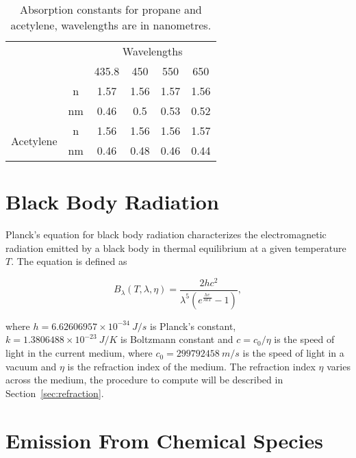 \begin{table}[htbp!]
\centering
\caption{Absorption constants for propane and acetylene, wavelengths are in nanometres.}
\label{tb:soot_absorption_coefficients}
\begin{tabular}{cc|c|c|c|c|}
\cline{3-6}
                                                 &    & \multicolumn{4}{c|}{Wavelengths} \\ \cline{3-6} 
                                                 &    & 435.8   & 450    & 550   & 650   \\ \hhline{--|=|=|=|=|}
\multicolumn{1}{|c|}{\multirow{2}{*}{Propane}}   & \multicolumn{1}{c||}{n}  & 1.57    & 1.56   & 1.57  & 1.56  \\ \cline{2-6} 
\multicolumn{1}{|c|}{}                           & \multicolumn{1}{c||}{nm} & 0.46    & 0.5    & 0.53  & 0.52  \\ \hline
\multicolumn{1}{|c|}{\multirow{2}{*}{Acetylene}} & \multicolumn{1}{c||}{n}  & 1.56    & 1.56   & 1.56  & 1.57  \\ \cline{2-6} 
\multicolumn{1}{|c|}{}                           & \multicolumn{1}{c||}{nm} & 0.46    & 0.48   & 0.46  & 0.44  \\ \hline
\end{tabular}
\end{table}

\section{Black Body Radiation}
\label{sec:black_body_radiation}

Planck's equation for black body radiation characterizes the electromagnetic radiation emitted by a black body in thermal equilibrium at a given temperature $T$.
The equation is defined as

\begin{equation}
B_\lambda(T, \lambda, \eta) = \frac{2 h c^2}{\lambda^5  (e ^\frac{h c}{\lambda k T} - 1)},
\end{equation}

where $h = 6.62606957 \times 10^{-34}~J/s$ is Planck's constant, $k = 1.3806488 \times 10^{-23}~J/K$ is Boltzmann constant and $c =  c_0 / \eta$ is the speed of light in the current medium, where $c_0 = 299792458~m/s$ is the speed of light in a vacuum and $\eta$ is the refraction index of the medium.
The refraction index $\eta$ varies across the medium, the procedure to compute will be described in Section~\ref{sec:refraction}.

\section{Emission From Chemical Species}
\label{sec:emission_from_chemical_species}

